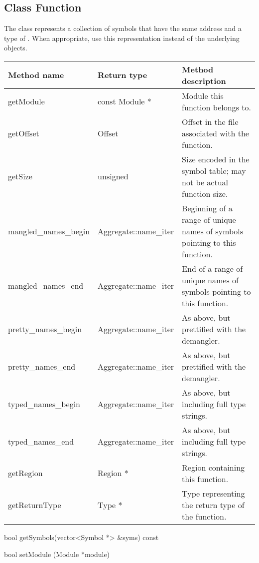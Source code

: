 \subsection{Class Function}\label{Function}
The  class represents a collection of symbols that have the same address
and a type of . When appropriate, use this representation instead of the underlying  objects. 

\begin{tabular}{p{1.25in}p{1.125in}p{3.125in}}
\toprule
Method name & Return type & Method description \\
\midrule
getModule & const Module * & Module this function belongs to. \\
getOffset & Offset & Offset in the file associated with the function. \\
getSize & unsigned & Size encoded in the symbol table; may not be actual function size. \\
mangled\_names\_begin & Aggregate::name\_iter & Beginning of a range of unique names of symbols pointing to this function. \\
mangled\_names\_end & Aggregate::name\_iter & End of a range of unique names of symbols pointing to this function. \\
pretty\_names\_begin &  Aggregate::name\_iter & As above, but prettified with the demangler. \\
pretty\_names\_end &  Aggregate::name\_iter & As above, but prettified with the demangler. \\
typed\_names\_begin & Aggregate::name\_iter  & As above, but including full type strings. \\
typed\_names\_end & Aggregate::name\_iter  & As above, but including full type strings. \\
getRegion & Region * & Region containing this function. \\
getReturnType & Type * & Type representing the return type of the function. \\
\bottomrule
\end{tabular}
	
\begin{apient}
bool getSymbols(vector<Symbol *> &syms) const
\end{apient}

\begin{apient}
bool setModule (Module *module)
\end{apient}


